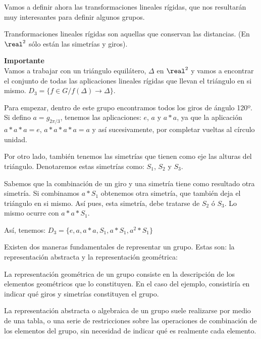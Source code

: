 \documentclass[nochap]{apuntes}
\begin{document}
Vamos a definir ahora las transformaciones lineales rígidas, que nos resultarán muy interesantes para definir algunos grupos.

\begin{defn}
Transformaciones lineales rígidas son aquellas que conservan las distancias. (En $\real^{2}$  sólo están las simetrías y giros).
\end{defn}

\begin{example}\textbf{Importante}\\
  Vamos a trabajar con un triángulo equilátero, $\Delta$  en $\real^{2}$  y vamos a encontrar el conjunto de todas las aplicaciones lineales rígidas
  que llevan el triángulo en si mismo. $D_{3}=\{f\in G / f(\Delta)\longrightarrow\Delta\}$.

  Para empezar, dentro de este grupo encontramos todos los giros de ángulo 120º. \\
  Si defino $a=g_{2\pi/3}$, tenemos las aplicaciones: $e$, $a$  y $a\ast a$, ya que la aplicación $a\ast a\ast a=e$, $a\ast a\ast a\ast a=a$  y así sucesivamente, por completar vueltas al círculo unidad.

  Por otro lado, también tenemos las simetrías que tienen como eje las alturas del triángulo. Denotaremos estas simetrías como: $S_{1}$, $S_{2}$  y $S_{3}$.

  Sabemos que la combinación de un giro y una simetría tiene como resultado otra simetría. Si combinamos $a\ast S_{1}$  obtenemos otra simetría, que también deja el triángulo en si mismo. Así pues, esta simetría, debe tratarse de $S_{2}$  ó $S_{3}$. Lo mismo ocurre con $a\ast a\ast S_{1}$.

  Así, tenemos: $D_{3}=\{e, a, a\ast a, S_{1}, a\ast S_{1}, a^{2}\ast S_{1}\}$
\end{example}

Existen dos maneras fundamentales de representar un grupo. Estas son: la representación abstracta y la representación geométrica:

\begin{defn}
  La representación geométrica de un grupo consiste en la descripción de los elementos geométricos que lo constituyen.
  En el caso del ejemplo, consistiría en indicar qué giros y simetrías constituyen el grupo.
\end{defn}

\begin{defn}
  La representación abstracta o algebraica de un grupo suele realizarse por medio de una tabla, o una serie de restricciones sobre las operaciones
  de combinación de los elementos del grupo, sin necesidad de indicar qué es realmente cada elemento.
\end{defn}
\end{document}
